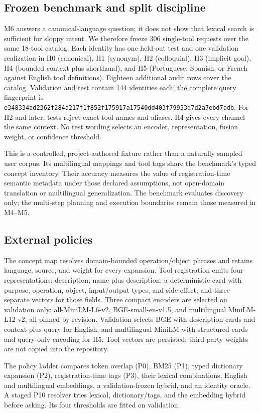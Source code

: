 \subsection{Frozen benchmark and split discipline}
M6 answers a canonical-language question; it does not show that lexical search
is sufficient for sloppy intent. We therefore freeze 306 single-tool requests
over the same 18-tool catalog. Each identity has one held-out test and one
validation realization in H0 (canonical), H1 (synonym), H2 (colloquial), H3
(implicit goal), H4 (bounded context plus shorthand), and H5 (Portuguese,
Spanish, or French against English tool definitions). Eighteen additional
audit rows cover the catalog. Validation and test contain 144 identities each;
the complete query fingerprint is
\texttt{e348334ad2362f284a217f1f852f175917a17540dd403f79953d7d2a7ebd7adb}.
For H2 and later, tests reject exact tool names and aliases. H4 gives every
channel the same context. No test wording selects an encoder, representation,
fusion weight, or confidence threshold.

This is a controlled, project-authored fixture rather than a naturally sampled
user corpus. Its multilingual mappings and tool tags share the benchmark's
typed concept inventory. Their accuracy measures the value of registration-time
semantic metadata under those declared assumptions, not open-domain translation
or multilingual generalization. The benchmark evaluates discovery only; the
multi-step planning and execution boundaries remain those measured in M4--M5.

\subsection{External policies}
The concept map resolves domain-bounded operation/object phrases and retains
language, source, and weight for every expansion. Tool registration emits four
representations: description; name plus description; a deterministic card with
purpose, operation, object, input/output types, and side effect; and three
separate vectors for those fields. Three compact encoders are selected on
validation only: all-MiniLM-L6-v2, BGE-small-en-v1.5, and multilingual
MiniLM-L12-v2, all pinned by revision. Validation selects BGE with description
cards and context-plus-query for English, and multilingual MiniLM with
structured cards and query-only encoding for H5. Tool vectors are persisted;
third-party weights are not copied into the repository.

The policy ladder compares token overlap (P0), BM25 (P1), typed dictionary
expansion (P2), registration-time tags (P3), their lexical combinations,
English and multilingual embeddings, a validation-frozen hybrid, and an
identity oracle. A staged P10 resolver tries lexical, dictionary/tags, and the
embedding hybrid before asking. Its four thresholds are fitted on validation.

